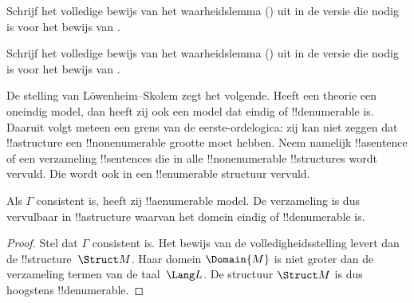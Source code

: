 \documentclass[openany]{memoir}
\begin{document}
\begin{prob}
Schrijf het volledige bewijs van het waarheidslemma
() uit in de versie die nodig is voor
het bewijs van .
\end{prob}
\tagendprob

\begin{prob}
Schrijf het volledige bewijs van het waarheidslemma
() uit in de versie die nodig is voor
het bewijs van .
\end{prob}
\tagendprob
\endgroup

\begingroup
\def\olfilename{OLP-0137}
\def\olfilepath{content/first-order-logic/completeness/}
\hypertarget{unit-OLP-0137}{}




De stelling van L\"owenheim--Skolem zegt het volgende. Heeft een theorie
een oneindig model, dan heeft zij ook een model dat eindig of
!!{denumerable} is. Daaruit volgt meteen een grens van de
eerste-ordelogica: zij kan niet zeggen dat !!a{structure} een
!!{nonenumerable} grootte moet hebben. Neem namelijk !!a{sentence} of een
verzameling !!{sentence}s die in alle !!{nonenumerable} !!{structure}s
wordt vervuld. Die wordt ook in een !!{enumerable} structuur vervuld.

\begin{thm} 
 Als $\Gamma$ consistent is, heeft zij
!!a{enumerable} model. De verzameling is dus vervulbaar in !!a{structure}
waarvan het domein eindig of !!{denumerable} is.
\end{thm}

\begin{proof}
Stel dat $\Gamma$ consistent is. Het bewijs van de volledigheidsstelling
levert dan de !!{structure}~$\Struct M$. Haar domein $\Domain{M}$ is niet
groter dan de verzameling termen van de taal~$\Lang L$. De structuur
$\Struct M$ is dus hoogstens !!{denumerable}.
\end{proof}
\end{document}
